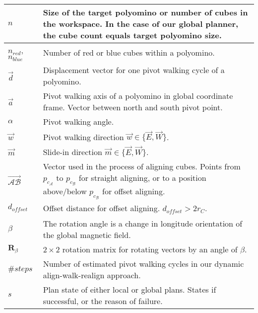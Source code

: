 \begin{xltabular}{\textwidth}{ l  X }
	$n$
	&
	Size of the target polyomino or number of cubes in the workspace.
	In the case of our global planner, the cube count equals target polyomino size.
	\\ \midrule
	
	$n_\textit{red}$, $n_\textit{blue}$
	&
	Number of red or blue cubes within a polyomino.
	\\ \midrule
	
	$\vec{d}$
	&
	Displacement vector for one pivot walking cycle of a polyomino.
	\\ \midrule
	
	$\vec{a}$
	&
	Pivot walking axis of a polyomino in global coordinate frame.
	Vector between north and south pivot point.
	\\ \midrule
	
	$\alpha$
	&
	Pivot walking angle.
	\\ \midrule
	
	$\vec{w}$
	&
	Pivot walking direction $\vec{w} \in \{ \vec{E}, \vec{W} \}$.
	\\ \midrule
	
	$\vec{m}$
	&
	Slide-in direction $\vec{m} \in \{ \vec{E}, \vec{W} \}$.
	\\ \midrule
	
	$\overrightarrow{\mathcal{A}\mathcal{B}}$
	&
	Vector used in the process of aligning cubes.
	Points from $p_{c_\mathcal{A}}$ to $p_{c_\mathcal{B}}$ for straight aligning, or to a position above/below $p_{c_\mathcal{B}}$ for offset aligning.
	\\ \midrule
	
	$d_\textit{offset}$
	&
	Offset distance for offset aligning.
	$d_\textit{offset} > 2 r_C$.
	\\ \midrule
	
	$\beta$  
	&
	The rotation angle is a change in longitude orientation of the global magnetic field.
	\\ \midrule
	
	$\mathbf{R}_\beta$  
	&
	$2 \times 2$ rotation matrix for rotating vectors by an angle of $\beta$.
	\\ \midrule
	
	$\#\textit{steps}$
	&
	Number of estimated pivot walking cycles in our dynamic align-walk-realign approach.
	\\ \midrule
	
	$s$
	&
	Plan state of either local or global plans. States if successful, or the reason of failure.
	\\ \midrule
	

\end{xltabular}
